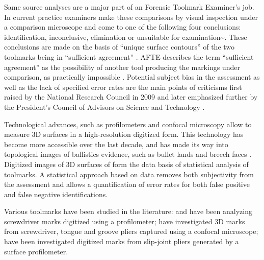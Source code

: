 \documentclass[12pt]{article}
\begin{document}
Same source analyses are a major part of an Forensic Toolmark Examiner's
job. In current practice examiners make these comparisons by visual
inspection under a comparison microscope and come to one of the
following four conclusions: identification, inconclusive, elimination or
unsuitable for examination\textasciitilde{}\citep{afte-toolmarks1998}.
These conclusions are made on the basis of ``unique surface contours''
of the two toolmarks being in ``sufficient agreement''
\citep{afte-toolmarks1998}. AFTE describes the term ``sufficient
agreement'' as the possibility of another tool producing the markings
under comparison, as practically impossible \citep{afte-toolmarks1998}.
Potential subject bias in the assessment as well as the lack of
specified error rates are the main points of criticisms first raised by
the National Research Council in 2009 \citep{NAS:2009} and later
emphasized further by the President's Council of Advisors on Science and
Technology \citep{pcast2016}.

Technological advances, such as profilometers and confocal microscopy
allow to measure 3D surfaces in a high-resolution digitized form. This
technology has become more accessible over the last decade, and has made
its way into topological images of ballistics evidence, such as bullet
lands and breech faces
\citep{DeKinder1, DeKinder2, Bachrach1, vorburger2016}. Digitized images
of 3D surfaces of form the data basis of statistical analysis of
toolmarks. A statistical approach based on data removes both
subjectivity from the assessment and allows a quantification of error
rates for both false positive and false negative identifications.

Various toolmarks have been studied in the literature:
\citet{manytoolmarks1} and \citet{chumbley} have been analyzing
screwdriver marks digitized using a profilometer; \citet{manytoolmarks2}
have investigated 3D marks from screwdriver, tongue and groove pliers
captured using a confocal microscope; \citet{afte-chumbley} have been
investigated digitized marks from slip-joint pliers generated by a
surface profilometer.
\end{document}
